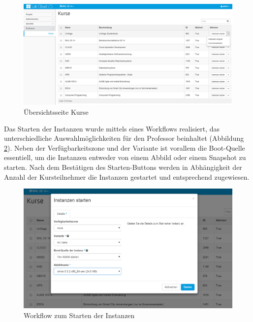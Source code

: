 \begin{figure}[H]
\centering
\includegraphics[scale=0.18]{img/dashboard-courses.png}
\caption{Übersichtsseite Kurse}
\label{dashboard-courses}
\end{figure}

Das Starten der Instanzen wurde mittels eines Workflows realisiert, das unterschiedliche Auswahlmöglichkeiten für den Professor beinhaltet (Abbildung \ref{dashboard-start-instances}). Neben der Verfügbarkeitszone und der Variante ist vorallem die Boot-Quelle essentiell, um die Instanzen entweder von einem Abbild oder einem Snapshot zu starten. Nach dem Bestätigen des Starten-Buttons werden in Abhängigkeit der Anzahl der Kursteilnehmer die Instanzen gestartet und entsprechend zugewiesen.

\begin{figure}[H]
\centering
\includegraphics[scale=0.25]{img/dashboard-start-instances.png}
\caption{Workflow zum Starten der Instanzen}
\label{dashboard-start-instances}
\end{figure}

